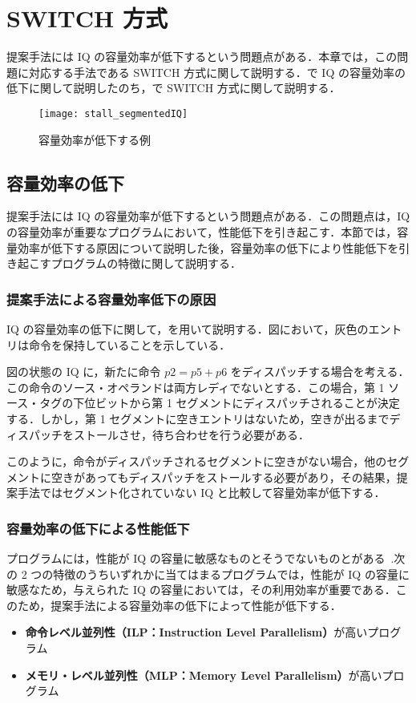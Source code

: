 \chapter{SWITCH 方式}
\label{sec:switch}
提案手法には IQ の容量効率が低下するという問題点がある．本章では，この問題に対応する手法である SWITCH  方式に関して説明する．で IQ の容量効率の低下に関して説明したのち，で SWITCH 方式に関して説明する．

\begin{figure}[tb]
  \centering
  \texttt{[image: stall\_segmentedIQ]}
  \caption{容量効率が低下する例}
  \label{fig:stall_segmentedIQ}
\end{figure}


\section{容量効率の低下}
\label{sec:occupency_reduction}
提案手法には IQ の容量効率が低下するという問題点がある．この問題点は，IQ の容量効率が重要なプログラムにおいて，性能低下を引き起こす．本節では，容量効率が低下する原因について説明した後，容量効率の低下により性能低下を引き起こすプログラムの特徴に関して説明する．

\subsection{提案手法による容量効率低下の原因}
IQ の容量効率の低下に関して，を用いて説明する．図において，灰色のエントリは命令を保持していることを示している．

図の状態の IQ に，新たに命令 $p2 = p5 + p6$ をディスパッチする場合を考える．この命令のソース・オペランドは両方レディでないとする．この場合，第 1 ソース・タグの下位ビットから第 1 セグメントにディスパッチされることが決定する．しかし，第 1 セグメントに空きエントリはないため，空きが出るまでディスパッチをストールさせ，待ち合わせを行う必要がある．

このように，命令がディスパッチされるセグメントに空きがない場合，他のセグメントに空きがあってもディスパッチをストールする必要があり，その結果，提案手法ではセグメント化されていない IQ と比較して容量効率が低下する．

\subsection{容量効率の低下による性能低下}
プログラムには，性能が IQ の容量に敏感なものとそうでないものとがある~\cite{Ando2019, Kora2013, Sembrant2015}.次の 2 つの特徴のうちいずれかに当てはまるプログラムでは，性能が IQ の容量に敏感なため，与えられた IQ の容量においては，その利用効率が重要である．このため，提案手法による容量効率の低下によって性能が低下する．
\begin{itemize}
  \item \textbf{命令レベル並列性（ILP：Instruction Level Parallelism）}が高いプログラム
  \item \textbf{メモリ・レベル並列性（MLP：Memory Level Parallelism）}が高いプログラム 
\end{itemize}

